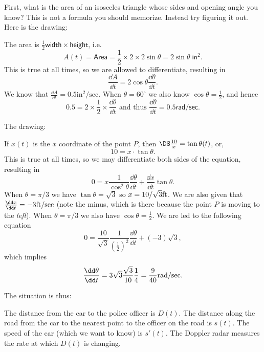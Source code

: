 \item[{\bfseries(IV17.7)}]

First, what is the area of an isosceles triangle whose sides and opening
angle you know?  This is not a formula you should memorize.  Instead try
figuring it out.  Here is the drawing:
\begin{center}
  
\end{center}
The area is $\frac12 \mathsf{width}\times\mathsf{height}$, i.e.
\[
A(t)
= \mathsf{Area}
= \frac12 \times 2 \times2\sin\theta
= 2\sin\theta \; \mathsf{in}^2.
\]
This is true at all times, so we are allowed to differentiate, resulting in
\[
\frac{\dd A} {\dd t} = 2\cos \theta \frac{\dd \theta} {\dd t}.
\]
We know that $\frac{\dd A} {\dd t} = 0.5 \text{in}^2/\text{sec}$.
When $\theta=60^\circ$ we also know $\cos \theta = \frac{1} {2}$, and hence
\[
0.5 = 2\times\frac{1} {2} \times \frac{\dd \theta} {\dd t}
\text{ and thus }
\frac{\dd \theta} {\dd t} = 0.5 \mathsf{rad}/\mathsf{sec}.
\]
\bigskip

\item[{\bfseries(IV17.8)}]

The drawing:
\begin{center}

\end{center}
If $x(t)$ is the $x$ coordinate of the point $P$, then
$\DS \frac{10} {x} = \tan \theta(t)$, or,
\[
10 = x\cdot \tan \theta.
\]
This is true at all times, so we may differentiate both sides
of the equation, resulting in
\[
0 = x \frac{1} {\cos^2\theta}\frac{\dd\theta} {\dd t} + \frac{\dd x} {\dd t}\tan \theta.
\]
When $\theta=\pi/3$ we have $\tan\theta = \sqrt{3}$ so $x=10/\sqrt{3}{\rm ft}$.
We are also given that $\frac{\dd x} {\dd t} = -3 {\rm ft}/{\rm sec}$
(note the minus, which
is there because the point $P$ is moving to the \emph{left}).
When $\theta=\pi/3$ we also have $\cos \theta = \frac12$.
We are led to the following equation
\[
0 = \frac{10} {\sqrt{3}} \frac{1} {(\frac12)^2} \frac{\dd \theta} {\dd t}
+ (-3) \sqrt{3},
\]
which implies
\[
 \frac{\dd \theta} {\dd t}
= 3\sqrt{3} \frac{\sqrt{3}} {10} \frac{1} {4}
= \frac{9} {40} {\rm rad}/{\rm sec}.
\]








\bigskip

\item[{\bfseries(IV17.23)}]

The situation is thus:
\begin{center}
  
\end{center}
The distance from the car to the police officer is $D(t)$.
The distance along the road from the car to the nearest point to the officer
on the road is $s(t)$.  The speed of the car (which we want to know) is $s'(t)$.
The Doppler radar measures the rate at which $D(t)$ is changing.

